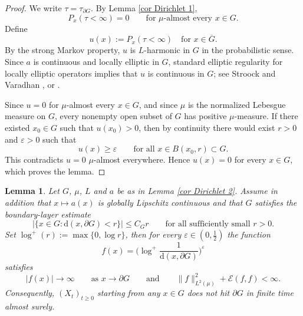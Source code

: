 \documentclass[11pt]{article}
\newcommand{\eps}{\varepsilon}
\newtheorem{lemma}[theorem]{Lemma}
\theoremstyle{rem}
\begin{document}
\begin{proof}
We write $\tau=\tau_{\partial G}$. By Lemma \ref{cor Dirichlet 1},
\[
P_x(\tau<\infty)=0
\qquad
\mbox{for $\mu$-almost every }x\in G.
\]
Define
\[
u(x):=P_x(\tau<\infty) \quad \text{for } x \in \overline G. 
\]
By the strong Markov property, $u$ is $L$-harmonic in $G$ in the probabilistic sense. Since $a$ is continuous and locally elliptic in $G$, standard elliptic regularity for locally elliptic operators implies that $u$ is continuous in $G$; see Stroock and Varadhan \cite{SV79}, or \cite[p.~65 and Ch.~VI]{Ba98}.

Since $u=0$ for $\mu$-almost every $x\in G$, and since $\mu$ is the normalized Lebesgue measure on $G$, every nonempty open subset of $G$ has positive $\mu$-measure. If there existed $x_0\in G$ such that $u(x_0)>0$, then by continuity there would exist $r>0$ and $\varepsilon>0$ such that
\[
u(x)\geq\varepsilon
\qquad
\mbox{for all }x\in B(x_0,r)\subset G.
\]
This contradicts $u=0$ $\mu$-almost everywhere. Hence $u(x)=0$ for every $x\in G$, which proves the lemma.
\end{proof}

\begin{lemma}\label{cor Dirichlet 3}
Let $G$, $\mu$, $L$ and $a$ be as in Lemma \ref{cor Dirichlet 2}. Assume in addition that $x\mapsto a(x)$ is globally Lipschitz continuous and that $G$ satisfies the boundary-layer estimate
\[
\big|\{x\in G:\mathrm d(x,\partial G)<r\}\big|
\leq C_G r
\qquad
\mbox{for all sufficiently small }r>0.
\]
 Set $\log^+(r):=\max\{0,\log r\}$, then  for every $\eps\in(0,\frac12)$ the function
\begin{equation}\label{example}
f(x) =
\bigg(  \log^+ \frac1{\mathrm d(x,\partial G)}\bigg)^\eps
\end{equation}
satisfies
\[
|f(x)|\to\infty
\qquad\mbox{as }x\to\partial G \qquad \text{and} \qquad 
\|f\|_{L^2(\mu)}^2+\mathcal E(f,f)<\infty.
\]
Consequently, $(X_t)_{t\geq0}$ starting from any $x\in G$ does not hit $\partial G$ in finite time almost surely.
\end{lemma}
\end{document}
